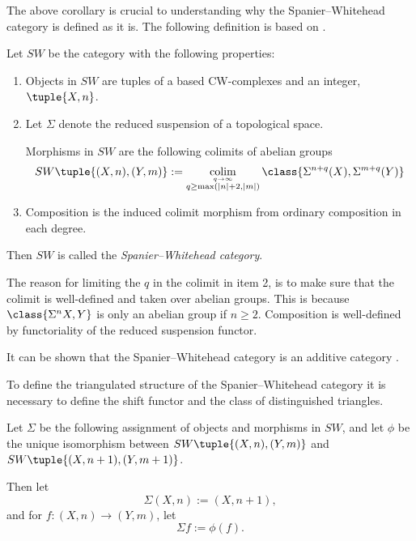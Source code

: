 The above corollary is crucial to understanding why the Spanier--Whitehead category is defined as it is. The following definition is based on \cite[Definition 2]{Schwede_2010}.

\begin{definition}
    \label{def:sw-cat}
    Let \( SW \) be the category with the following properties:
    \begin{enumerate}
        \item {
            Objects in \( SW \) are tuples of a based CW-complexes and an integer, \( \tuple{X, n} \).
        }
        \item {
            Let \( \Sigma \) denote the reduced suspension of a topological space.

            Morphisms in \( SW \) are the following colimits of abelian groups
            \[
                SW\tuple{ (X, n), (Y, m) } := \colim_{\stackrel{q \to \infty}{q \geq \max(|n| + 2, |m|)}} \class{ \Sigma^{n + q}(X), \Sigma^{m + q}(Y) }
            \]
        }
        \item {
            Composition is the induced colimit morphism from ordinary composition in each degree.
        }
    \end{enumerate}

    Then \( SW \) is called the \emph{Spanier--Whitehead category}.
\end{definition}

The reason for limiting the \( q \) in the colimit in item 2, is to make sure that the colimit is well-defined and taken over abelian groups. This is because \( \class{\Sigma^n X, Y} \) is only an abelian group if \( n \geq 2 \). Composition is well-defined by functoriality of the reduced suspension functor.

It can be shown that the Spanier--Whitehead category is an additive category \cite[Proposition 5.7]{Daria_Bachelor}.

To define the triangulated structure of the Spanier--Whitehead category it is necessary to define the shift functor and the class of distinguished triangles.

\begin{definition}
    \label{def:sw-shift}
    Let \( \Sigma \) be the following assignment of objects and morphisms in \( SW \), and let \( \phi \) be the unique isomorphism between \( SW\tuple{ (X, n), (Y, m) } \) and \( SW\tuple{ (X, n + 1), (Y, m + 1) } \).

    Then let
    \[
        \Sigma(X, n) := (X, n + 1),
    \] 
    and for \( f: (X, n) \to (Y, m) \), let
    \[
        \Sigma f := \phi(f).
    \]
\end{definition}

